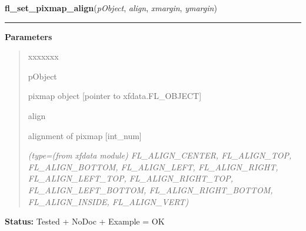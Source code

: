 \hspace{.8\funcindent}\begin{boxedminipage}{\funcwidth}

    \raggedright \textbf{fl\_set\_pixmap\_align}(\textit{pObject}, \textit{align}, \textit{xmargin}, \textit{ymargin})

    \vspace{-1.5ex}

    \rule{\textwidth}{0.5\fboxrule}
\setlength{\parskip}{2ex}
\setlength{\parskip}{1ex}
      \textbf{Parameters}
      \vspace{-1ex}

      \begin{quote}
        \begin{Ventry}{xxxxxxx}

          \item[pObject]

          pixmap object [pointer to xfdata.FL\_OBJECT]

          \item[align]

          alignment of pixmap [int\_num]

            {\it (type=(from xfdata module) FL\_ALIGN\_CENTER, FL\_ALIGN\_TOP, FL\_ALIGN\_BOTTOM, 
FL\_ALIGN\_LEFT, FL\_ALIGN\_RIGHT, FL\_ALIGN\_LEFT\_TOP, 
FL\_ALIGN\_RIGHT\_TOP, FL\_ALIGN\_LEFT\_BOTTOM, FL\_ALIGN\_RIGHT\_BOTTOM, 
FL\_ALIGN\_INSIDE, FL\_ALIGN\_VERT)}

        \end{Ventry}

      \end{quote}

\textbf{Status:} Tested + NoDoc + Example = OK



    \end{boxedminipage}

    \label{xformslib:library:fl_set_pixmap_align}

    \vspace{0.5ex}

